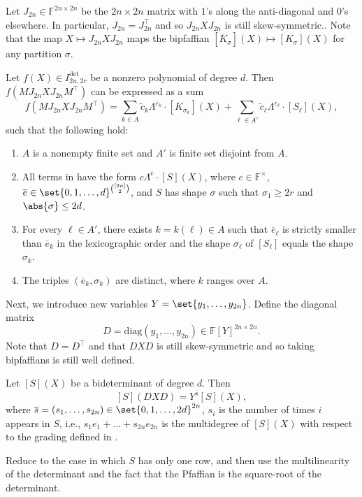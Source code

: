 \documentclass[10pt,a4paper]{amsart}
\newcommand*\ie{i.e.}
\newcommand*\F{\mathbb{F}}
\begin{document}
Let $J_{2n} \in \F^{2n \times 2n}$ be the $2n \times 2n$ matrix with $1$'s along the anti-diagonal and $0$'s elsewhere.
In particular, $J_{2n} = J_{2n}^\top$ and so $J_{2n} X J_{2n}$ is still skew-symmetric..
Note that the map $X \mapsto J_{2n} X J_{2n}$ maps the bipfaffian $[\overline{K}_\sigma](X) \mapsto [K_\sigma](X)$ for any partition $\sigma$.
\begin{cor}\label{cor:reformulated_pfaff}
Let $f(X) \in I^{\det}_{2n, 2r}$ be a nonzero polynomial of degree $d$.
Then $f(M J_{2n} X J_{2n} M^\top)$ can be expressed as a sum
\begin{equation}\label{eq:expansion3_pfaff}
    f(M J_{2n} X J_{2n} M^\top) = \sum_{k \in A} \widetilde{c}_{k} \Lambda^{\overline{e}_k}\cdot [K_{\sigma_k}](X) + \sum_{\ell\in A'} \widetilde{c}_{\ell} \Lambda^{\overline{e}_\ell}\cdot [S_\ell](X),
\end{equation}
such that the following hold:
\begin{enumerate}
    \item\label{item:expansion3_i0_pfaff} $A$ is a nonempty finite set and $A'$ is finite set disjoint from $A$.
    \item\label{item:expansion3_i1_pfaff} All terms in  have the form $c \Lambda^{\overline{e}}\cdot [S](X)$, where $c\in \F^\times$, $\overline{e}\in \set{0,1,\dots,d}^{\binom{[2n]}{2}}$, and $S$ has shape $\sigma$ such that $\sigma_1 \geq 2r$ and $\abs{\sigma} \leq 2d$.
    \item\label{item:expansion3_i1.5_pfaff} For every $\ell\in A'$, there exists $k=k(\ell)\in A$ such that $\overline{e}_\ell$ is strictly smaller than $\overline{e}_k$ in the lexicographic order and the shape $\sigma_\ell$ of $[S_\ell]$ equals the shape $\sigma_k$.
    \item\label{item:expansion3_i2_pfaff} The triples $(\overline{e}_k,\sigma_k)$ are distinct, where $k$ ranges over $A$.
\end{enumerate} 
\end{cor}

Next, we introduce new variables $Y=\set{y_1,\dots,y_{2n}}$.
Define the diagonal matrix
\[
    D=\mathrm{diag}(y_1,\dots,y_{2n}) \in \F[Y]^{2n \times 2n}.
\]
Note that $D = D^\top$ and that $D X D$ is still skew-symmetric and so taking bipfaffians is still well defined.
\begin{lem}\label{lem:diagonals_pfaff}
Let $[S](X)$ be a bideterminant of degree $d$.
Then 
\[
    [S](D X D)= Y^{\overline{s}} [S](X),
\]
where $\overline{s}=(s_1,\dots,s_{2n})\in \set{0, 1, \dots, 2d}^{2n}$, $s_i$ is the number of times $i$ appears in $S$, \ie, $s_1 e_1+\dots+s_{2n} e_{2n}$ is the multidegree of $[S](X)$ with respect to the grading defined in .
\end{lem}
\begin{pf}
    Reduce to the case in which $S$ has only one row, and then use the multilinearity of the determinant and the fact that the Pfaffian is the square-root of the determinant.
\end{pf}
\end{document}
